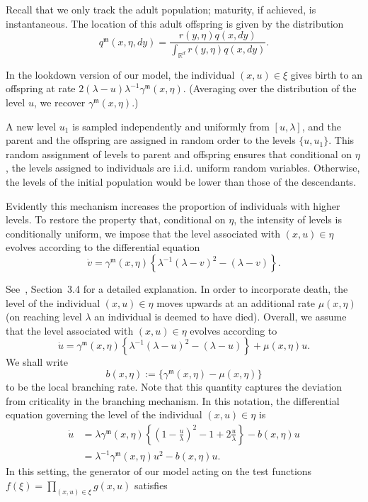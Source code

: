 \documentclass[12pt]{article}
\begin{document}
Recall that we only track the adult population; maturity, if achieved, is instantaneous.
The location of this adult offspring is given by
the distribution 
\[ q^{\mathfrak{m}}(x,\eta,dy) = \frac{r(y,\eta) q(x,dy)}{\int_{\mathbb{R}^d} r(y,\eta) q(x,dy)}. \]

In the lookdown version of our model,
the individual $(x,u)\in \xi$
gives birth to an offspring at rate 
$2(\lambda-u)\lambda^{-1} \gamma^{\mathfrak{m}}(x, \eta)$. 
(Averaging over the distribution of the
level $u$,
we recover $\gamma^{\mathfrak{m}}(x, \eta)$.)

A new level $u_1$ is sampled independently and
uniformly from $[u,\lambda]$,
and the parent and the offspring are assigned in random order to the  levels $\{u, u_1\}$.
This random assignment of levels to parent
and offspring ensures that conditional on $\eta$,
the levels assigned to individuals are i.i.d.
uniform random variables.
Otherwise, the levels of the initial population would be lower than those of the descendants.

Evidently this mechanism increases the proportion
of individuals with higher levels.
To restore the property that,
conditional on $\eta$,
the intensity of levels is conditionally uniform,
we impose that 
the level associated with $(x,u)\in\eta$
evolves according to the differential equation
$$\dot{v}=  \gamma^{\mathfrak{m}}(x, \eta) 
\left\{\lambda^{-1}(\lambda -v)^{2}
-(\lambda -v)\right\}.$$

See~\cite{etheridge/kurtz:2018}, Section~3.4 for a detailed explanation.
In order to incorporate death,
the level of the individual $(x,u)\in \eta$ 
moves upwards at an additional rate
$ \mu(x,\eta)$
(on reaching level $\lambda$
an individual is deemed to have died).
Overall, we assume that
the level associated with $(x,u)\in\eta$
evolves according to
$$\dot{u}= \gamma^{\mathfrak{m}}(x, \eta) 
\left\{\lambda^{-1}(\lambda -u)^{2}
-(\lambda -u)\right\}+\mu(x,\eta)u.$$
We shall write 
$$b(x,\eta):= \big\{\gamma^{\mathfrak{m}}(x,\eta)
-\mu(x,\eta)\big\}$$
to be the local branching rate.
Note that this quantity captures
the deviation from criticality
in the branching mechanism.
In this notation,
the differential equation 
governing the level of the individual $(x,u)\in\eta$ is
\begin{align}
\dot{u}&=\lambda  \gamma^{\mathfrak{m}}(x,\eta) 
\left\{\left(1-\frac{u}{\lambda}\right)^{2}
-1 +2\frac{u}{\lambda}\right\} -b(x,\eta)u \nonumber \\
&=\lambda^{-1}  \gamma^{\mathfrak{m}}(x,\eta) u^2 -b(x,\eta)u. \label{differential equation for level}
\end{align}
In this setting, the generator of our model
acting on the test functions $f(\xi)=\prod_{(x,u) \in \xi}g(x,u)$
satisfies
\end{document}
